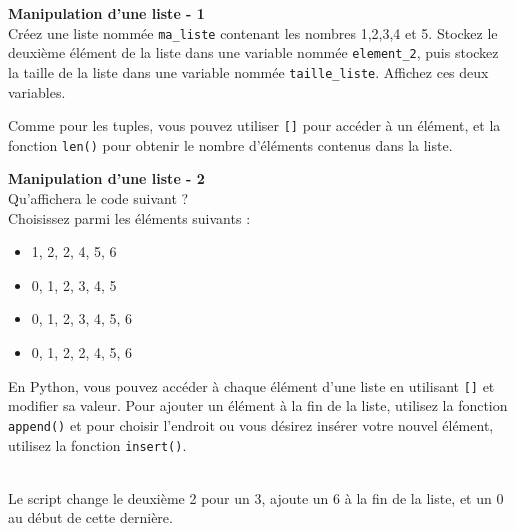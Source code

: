      \begin{Exercice}[5 minutes] \textbf{Manipulation d'une liste - 1}\\
        Créez une liste nommée \lstinline{ma_liste} contenant les nombres 1,2,3,4 et 5. Stockez le deuxième élément de la liste dans une variable nommée \lstinline{element_2}, puis stockez la taille de la liste dans une variable nommée \lstinline{taille_liste}. Affichez ces deux variables.\\
    
        \begin{conseil}
            Comme pour les tuples, vous pouvez utiliser \lstinline{[]} pour accéder à un élément, et la fonction \lstinline{len()} pour obtenir le nombre d'éléments contenus dans la liste.
        \end{conseil}
        
        \begin{solution}
             
        \end{solution}
    \end{Exercice}
    
    \begin{Exercice}[5 minutes] \textbf{Manipulation d'une liste - 2}\\
       Qu'affichera le code suivant ? \\
       
        
       
       Choisissez parmi les éléments suivants :
       
       	\begin{itemize}
        \item 1, 2, 2, 4, 5, 6 \\
        \item 0, 1, 2, 3, 4, 5 \\
        \item 0, 1, 2, 3, 4, 5, 6 \\
        \item 0, 1, 2, 2, 4, 5, 6 \\
        \end{itemize}
    
        \begin{conseil}
            En Python, vous pouvez accéder à chaque élément d'une liste en utilisant \lstinline{[]} et modifier sa valeur. Pour ajouter un élément à la fin de la liste, utilisez la fonction \lstinline{append()} et pour choisir l'endroit ou vous désirez insérer votre nouvel élément, utilisez la fonction \lstinline{insert()}.
        \end{conseil}
        
        \begin{solution}
            [0, 1, 2, 3, 4, 5, 6] \\
            Le script change le deuxième 2 pour un 3, ajoute un 6 à la fin de la liste, et un 0 au début de cette dernière.
        \end{solution}
    \end{Exercice}
    
